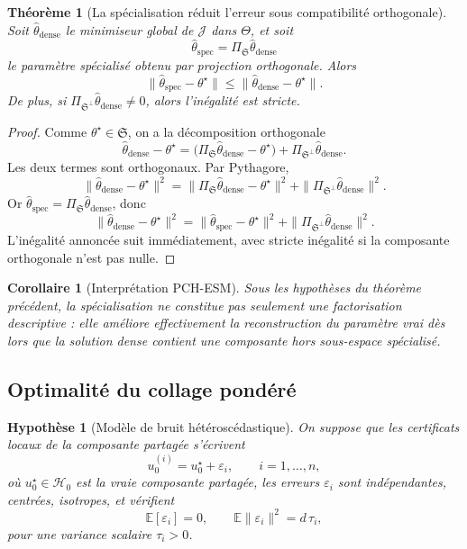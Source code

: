 \documentclass[11pt,a4paper]{article}
\newtheorem{assumption}{Hypothèse}[section]
\newtheorem{theorem}{Théorème}[section]
\newtheorem{corollary}{Corollaire}[section]
\newcommand{\Hh}{\mathcal H}
\newcommand{\1}{\mathbf 1}
\begin{document}
\begin{theorem}[La spécialisation réduit l'erreur sous compatibilité orthogonale]
Soit \(\hat\theta_{\mathrm{dense}}\) le minimiseur global de \(\mathcal J\) dans \(\Theta\), et soit
\[
\hat\theta_{\mathrm{spec}}=\Pi_{\mathfrak S}\hat\theta_{\mathrm{dense}}
\]
le paramètre spécialisé obtenu par projection orthogonale.
Alors
\[
\|\hat\theta_{\mathrm{spec}}-\theta^\star\|
\le
\|\hat\theta_{\mathrm{dense}}-\theta^\star\|.
\]
De plus, si \(\Pi_{\mathfrak S^\perp}\hat\theta_{\mathrm{dense}}\neq 0\), alors l'inégalité est stricte.
\end{theorem}

\begin{proof}
Comme \(\theta^\star\in\mathfrak S\), on a la décomposition orthogonale
\[
\hat\theta_{\mathrm{dense}}-\theta^\star
=
\bigl(\Pi_{\mathfrak S}\hat\theta_{\mathrm{dense}}-\theta^\star\bigr)
+
\Pi_{\mathfrak S^\perp}\hat\theta_{\mathrm{dense}}.
\]
Les deux termes sont orthogonaux. Par Pythagore,
\[
\|\hat\theta_{\mathrm{dense}}-\theta^\star\|^2
=
\|\Pi_{\mathfrak S}\hat\theta_{\mathrm{dense}}-\theta^\star\|^2
+
\|\Pi_{\mathfrak S^\perp}\hat\theta_{\mathrm{dense}}\|^2.
\]
Or \(\hat\theta_{\mathrm{spec}}=\Pi_{\mathfrak S}\hat\theta_{\mathrm{dense}}\), donc
\[
\|\hat\theta_{\mathrm{dense}}-\theta^\star\|^2
=
\|\hat\theta_{\mathrm{spec}}-\theta^\star\|^2
+
\|\Pi_{\mathfrak S^\perp}\hat\theta_{\mathrm{dense}}\|^2.
\]
L'inégalité annoncée suit immédiatement, avec stricte inégalité si la composante orthogonale n'est pas nulle.
\end{proof}

\begin{corollary}[Interprétation PCH-ESM]
Sous les hypothèses du théorème précédent, la spécialisation ne constitue pas seulement une factorisation descriptive :
elle améliore effectivement la reconstruction du paramètre vrai dès lors que la solution dense contient une composante hors sous-espace spécialisé.
\end{corollary}

\subsection{Optimalité du collage pondéré}

\begin{assumption}[Modèle de bruit hétéroscédastique]
On suppose que les certificats locaux de la composante partagée s'écrivent
\[
u_0^{(i)} = u_0^\star + \varepsilon_i,
\qquad i=1,\dots,n,
\]
où \(u_0^\star\in\Hh_0\) est la vraie composante partagée, les erreurs \(\varepsilon_i\) sont indépendantes,
centrées, isotropes, et vérifient
\[
\mathbb E[\varepsilon_i]=0,
\qquad
\mathbb E\|\varepsilon_i\|^2 = d\,\tau_i,
\]
pour une variance scalaire \(\tau_i>0\).
\end{assumption}
\end{document}
